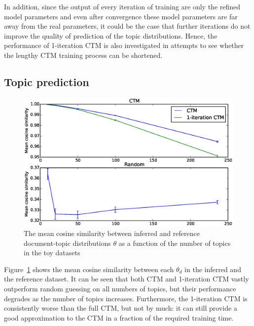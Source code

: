 \documentclass[12pt,a4paper,twoside,openright]{report}
\begin{document}
In addition, since the output of every iteration of training are only the refined model parameters and even after convergence these model parameters are far away from the real parameters, it could be the case that further iterations do not improve the quality of prediction of the topic distributions. Hence, the performance of 1-iteration CTM is also investigated in attempts to see whether the lengthy CTM training process can be shortened.

\subsection{Topic prediction}

\begin{figure}[!htb]
\includegraphics[width=\textwidth]{sim-cosine.eps}
\caption{The mean cosine similarity between inferred and reference document-topic distributions $\theta$ as a function of the number of topics in the toy datasets}
\label{fig:sim-cosine}
\end{figure}

Figure~\ref{fig:sim-cosine} shows the mean cosine similarity between each $\theta_d$ in the inferred and the reference dataset. It can be seen that both CTM and 1-iteration CTM vastly outperform random guessing on all numbers of topics, but their performance degrades as the number of topics increases. Furthermore, the 1-iteration CTM is consistently worse than the full CTM, but not by much: it can still provide a good approximation to the CTM in a fraction of the required training time.
\end{document}
